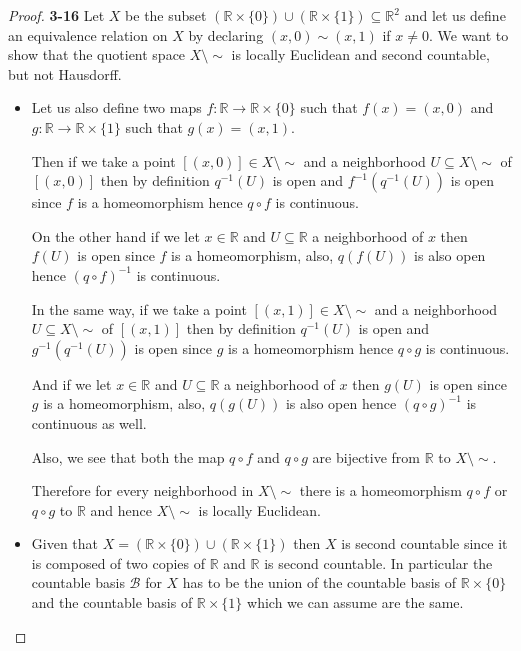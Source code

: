 \documentclass[11pt]{article}
\newcommand{\R}{\mathbb{R}}
\newcommand{\setmin}{\setminus}
\theoremstyle{definition}
\begin{document}
\begin{proof}{\textbf{3-16}}
    Let $X$ be the subset $(\R\times \{0\})\cup (\R\times \{1\}) \subseteq \R^2$
    and let us define an equivalence relation on $X$ by declaring
    $(x,0)\sim(x,1)$ if $x \neq 0$. We want to show that the quotient space
    $X\setmin \sim$ is locally Euclidean and second countable, but not
    Hausdorff.
    \begin{itemize}
        \item
        Let us also define two maps $f: \R \to \R \times \{0\}$ such that
        $f(x) = (x,0)$ and $g:\R \to \R \times \{1\}$ such that $g(x) = (x,1)$.
        
        Then if we take a point $[(x,0)] \in X\setmin\sim$ and a neighborhood
        $U \subseteq X\setmin\sim$ of $[(x,0)]$
        then by definition $q^{-1}(U)$ is open and $f^{-1}(q^{-1}(U))$
        is open since $f$ is a homeomorphism hence $q\circ f$ is continuous.
        
        On the other hand if we let $x \in \R$ and $U \subseteq \R$ a neighborhood
        of $x$ then $f(U)$ is open since $f$ is a homeomorphism, also, $q(f(U))$
        is also open hence $(q \circ f)^{-1}$ is continuous.
        
        In the same way, if we take a point $[(x,1)] \in X\setmin\sim$ and a
        neighborhood $U \subseteq X\setmin\sim$ of $[(x,1)]$
        then by definition $q^{-1}(U)$ is open and $g^{-1}(q^{-1}(U))$
        is open since $g$ is a homeomorphism hence $q\circ g$ is continuous.
        
        And if we let $x \in \R$ and $U \subseteq \R$ a neighborhood
        of $x$ then $g(U)$ is open since $g$ is a homeomorphism, also, $q(g(U))$
        is also open hence $(q \circ g)^{-1}$ is continuous as well.
        
        Also, we see that both the map $q \circ f$ and $q \circ g$ are bijective
        from $\R$ to $X \setmin\sim$.
        
        Therefore for every neighborhood in $X\setmin\sim$
        there is a homeomorphism $q \circ f$ or $q \circ g$ to $\R$ and hence
        $X \setmin\sim$ is locally Euclidean.

        \item
        Given that $X = (\R \times \{0\}) \cup (\R \times \{1\})$ then $X$
        is second countable since it is composed of two copies of $\R$ and $\R$
        is second countable. In particular the countable basis $\mathcal{B}$
        for $X$ has to be the union of the countable basis of $\R \times \{0\}$
        and the countable basis of $\R \times \{1\}$ which we can assume
        are the same.
        

\end{itemize}
\end{proof}
\end{document}
